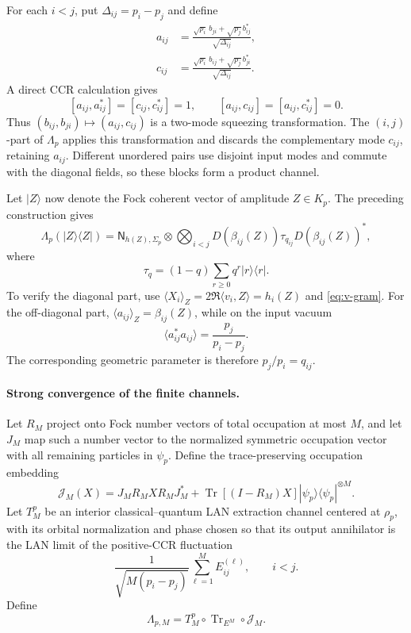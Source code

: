 \documentclass[11pt]{article}
\theoremstyle{remark}
\theoremstyle{plain}
\newcommand{\Tr}{\operatorname{Tr}}
\newcommand{\ket}[1]{|#1\rangle}
\newcommand{\proj}[1]{|#1\rangle\!\langle #1|}
\newcommand{\ot}{\otimes}
\begin{document}
For each \(i<j\), put \(\Delta_{ij}=p_i-p_j\) and define
\begin{align}
  a_{ij}
  &=\frac{\sqrt{p_i}\,b_{ji}
          +\sqrt{p_j}\,b_{ij}^*}
         {\sqrt{\Delta_{ij}}},
  \label{eq:retained-mode}\\
  c_{ij}
  &=\frac{\sqrt{p_i}\,b_{ij}
          +\sqrt{p_j}\,b_{ji}^*}
         {\sqrt{\Delta_{ij}}}.
  \label{eq:complement-mode}
\end{align}
A direct CCR calculation gives
\[
  [a_{ij},a_{ij}^*]=[c_{ij},c_{ij}^*]=1,
  \qquad
  [a_{ij},c_{ij}]=[a_{ij},c_{ij}^*]=0.
\]
Thus \((b_{ij},b_{ji})\mapsto(a_{ij},c_{ij})\) is a two-mode
squeezing transformation.  The \((i,j)\)-part of \(\Lambda_p\) applies
this transformation and discards the complementary mode \(c_{ij}\),
retaining \(a_{ij}\).  Different unordered pairs use disjoint input modes
and commute with the diagonal fields, so these blocks form a product
channel.

Let \(\ket Z\) now denote the Fock coherent vector of amplitude
\(Z\in K_p\).  The preceding construction gives
\begin{equation}\label{eq:Lambda-coherent}
  \Lambda_p(\proj Z)
  =\mathsf N_{h(Z),\Sigma_p}
   \ot\bigotimes_{i<j}
   D(\beta_{ij}(Z))\tau_{q_{ij}}D(\beta_{ij}(Z))^*,
\end{equation}
where
\[
  \tau_q=(1-q)\sum_{r\ge0}q^r\proj r.
\]
To verify the diagonal part, use
\(\langle X_i\rangle_Z=2\Re\langle v_i,Z\rangle=h_i(Z)\) and
\eqref{eq:v-gram}.  For the off-diagonal part,
\(\langle a_{ij}\rangle_Z=\beta_{ij}(Z)\), while on the input vacuum
\[
  \langle a_{ij}^*a_{ij}\rangle
  =\frac{p_j}{p_i-p_j}.
\]
The corresponding geometric parameter is therefore \(p_j/p_i=q_{ij}\).

\paragraph{Strong convergence of the finite channels.}

Let \(R_M\) project onto Fock number vectors of total occupation at most
\(M\), and let \(J_M\) map such a number vector to the normalized symmetric
occupation vector with all remaining particles in \(\psi_p\).  Define the
trace-preserving occupation embedding
\begin{equation}\label{eq:occupation-channel}
  \mathcal J_M(X)
  =J_MR_MXR_MJ_M^*
   +\Tr[(I-R_M)X]\proj{\psi_p}^{\ot M}.
\end{equation}
Let \(T_M^p\) be an interior classical--quantum LAN extraction channel centered
at \(\rho_p\), with its orbital normalization and phase chosen so that its
output annihilator is the LAN limit of the positive-CCR fluctuation
\[
  \frac1{\sqrt{M(p_i-p_j)}}
  \sum_{\ell=1}^M E_{ij}^{(\ell)},
  \qquad i<j.
\]
Define
\begin{equation}\label{eq:finite-Lambda}
  \Lambda_{p,M}
  =T_M^p\circ\Tr_{E^M}\circ\mathcal J_M.
\end{equation}
\end{document}
